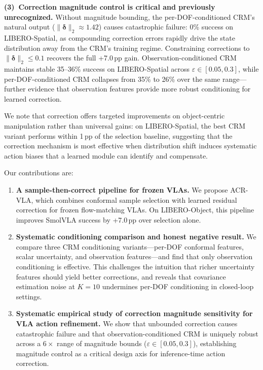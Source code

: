 \textbf{(3)~Correction magnitude control is critical and previously unrecognized.}
Without magnitude bounding, the per-DOF-conditioned CRM's natural output ($\|\boldsymbol{\delta}\|_2 \approx 1.42$) causes catastrophic failure: 0\% success on LIBERO-Spatial, as compounding correction errors rapidly drive the state distribution away from the CRM's training regime.
Constraining corrections to $\|\boldsymbol{\delta}\|_2 \leq 0.1$ recovers the full +7.0\,pp gain.
Observation-conditioned CRM maintains stable 35--36\% success on LIBERO-Spatial across $\varepsilon \in [0.05, 0.3]$, while per-DOF-conditioned CRM collapses from 35\% to 26\% over the same range---further evidence that observation features provide more robust conditioning for learned correction.

We note that correction offers targeted improvements on object-centric manipulation rather than universal gains: on LIBERO-Spatial, the best CRM variant performs within 1\,pp of the selection baseline, suggesting that the correction mechanism is most effective when distribution shift induces systematic action biases that a learned module can identify and compensate.

Our contributions are:
\begin{enumerate}[leftmargin=*,nosep]
  \item \textbf{A sample-then-correct pipeline for frozen VLAs.}
  We propose ACR-VLA, which combines conformal sample selection with learned residual correction for frozen flow-matching VLAs.
  On LIBERO-Object, this pipeline improves SmolVLA success by +7.0\,pp over selection alone.

  \item \textbf{Systematic conditioning comparison and honest negative result.}
  We compare three CRM conditioning variants---per-DOF conformal features, scalar uncertainty, and observation features---and find that only observation conditioning is effective.
  This challenges the intuition that richer uncertainty features should yield better corrections, and reveals that covariance estimation noise at $K{=}10$ undermines per-DOF conditioning in closed-loop settings.

  \item \textbf{Systematic empirical study of correction magnitude sensitivity for VLA action refinement.}
  We show that unbounded correction causes catastrophic failure and that observation-conditioned CRM is uniquely robust across a $6{\times}$ range of magnitude bounds ($\varepsilon \in [0.05, 0.3]$), establishing magnitude control as a critical design axis for inference-time action correction.
\end{enumerate}
